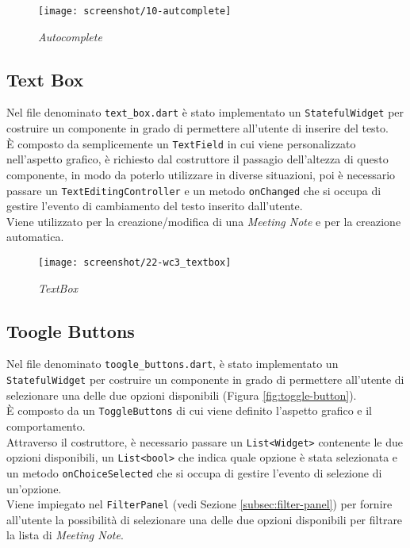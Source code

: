 \begin{figure}[!h] 
    \centering 
    \texttt{[image: screenshot/10-autcomplete]} 
    \caption{\emph{Autocomplete}}
    \label{fig:autocomplete}
\end{figure}

\subsection{Text Box}
\label{subsec:text-box}

Nel file denominato \lstinline{text_box.dart} è stato implementato un \lstinline{StatefulWidget} per costruire un componente in grado di permettere all'utente di inserire del testo.\\
È composto da semplicemente un \lstinline{TextField} \cite{site:text-field} in cui viene personalizzato nell'aspetto grafico, è richiesto dal costruttore il passagio dell'altezza di questo componente, in modo da poterlo utilizzare in diverse situazioni, poi è necessario passare un \lstinline{TextEditingController} \cite{site:text-editing-controller} e un metodo \lstinline{onChanged} che si occupa di gestire l'evento di cambiamento del testo inserito dall'utente.\\
Viene utilizzato per la creazione/modifica di una \emph{Meeting Note} e per la creazione automatica.

\begin{figure}[!h] 
    \centering 
    \texttt{[image: screenshot/22-wc3\_textbox]} 
    \caption{\emph{TextBox}}
    \label{fig:text-box}
\end{figure}

\subsection{Toogle Buttons}
\label{subsec:toogle-buttons}

Nel file denominato \lstinline{toogle_buttons.dart}, è stato implementato un \lstinline{StatefulWidget} per costruire un componente in grado di permettere all'utente di selezionare una delle due opzioni disponibili (Figura \ref{fig:toggle-button}).\\
È composto da un \lstinline{ToggleButtons} \cite{site:toggle-buttons} di cui viene definito l'aspetto grafico e il comportamento.\\
Attraverso il costruttore, è necessario passare un \lstinline{List<Widget>} contenente le due opzioni disponibili, un \lstinline{List<bool>} che indica quale opzione è stata selezionata e un metodo \lstinline{onChoiceSelected} che si occupa di gestire l'evento di selezione di un'opzione.\\
Viene impiegato nel \lstinline{FilterPanel} (vedi Sezione \ref{subsec:filter-panel}) per fornire all'utente la possibilità di selezionare una delle due opzioni disponibili per filtrare la lista di \emph{Meeting Note}.

